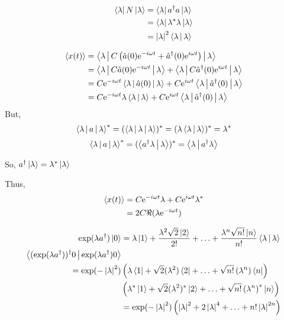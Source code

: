 \documentclass{article}
\newcommand{\me}{\mathrm{e}}
\begin{document}
\begin{align*}
   \Bra{\lambda} N \Ket{\lambda}
   &= \Bra{\lambda} a^{\dagger} a \Ket{\lambda} \\
   &= \Bra{\lambda} \lambda^{*} \lambda \Ket{\lambda} \\
   &= \left| \lambda \right|^{2} \Braket{\lambda|\lambda}
\end{align*}

\begin{align*}
   \Braket{x(t)}
   &= \Braket{\lambda | C \left( \hat{a}(0)\me^{-i \omega t} +
\hat{a}^{\dagger}(0)\me^{i \omega t} \right) | \lambda} \\
&= \Braket{\lambda | C \hat{a}(0)\me^{-i \omega t} | \lambda} +
\Braket{\lambda | C \hat{a}^\dagger(0)\me^{i \omega t} | \lambda} \\
&= C\me^{-i \omega t} \Braket{\lambda | \hat{a}(0) | \lambda} +
C\me^{i \omega t} \Braket{\lambda | \hat{a}^\dagger(0) | \lambda} \\
&= C\me^{-i \omega t} \lambda \Braket{\lambda | \lambda} +
C\me^{i \omega t} \Braket{\lambda | \hat{a}^\dagger(0) | \lambda} \\
\end{align*}
But,
\begin{equation}
   \Braket{\lambda | a | \lambda}^{*} = (\Braket{\lambda | \lambda | \lambda})^{*}
   = (\lambda \Braket{\lambda | \lambda})^* = \lambda^{*}
\end{equation}
\begin{equation}
   \Braket{\lambda | a | \lambda}^{*} = (\Braket{a^{\dagger}\lambda |
   \lambda})^{*} = \Braket{\lambda | a^{\dagger} \lambda}
\end{equation}

So, $ a^{\dagger} \Ket{\lambda} = \lambda^{*} \Ket{\lambda} $

Thus,
\begin{align*}
   \Braket{x(t)} &= C \me^{-i \omega t} \lambda
   + C \me^{i \omega t} \lambda^{*} \\
   &= 2 C \Re(\lambda \me^{-i \omega t})
\end{align*}

\begin{align*}
   \exp(\lambda a^{\dagger})\Ket{0} &= \lambda \Ket{1} + \frac{\lambda^{2}
   \sqrt{2} \Ket{2}}{2!}
   + \ldots + \frac{\lambda^{n} \sqrt{n!} \Ket{n}}{n!}
   \Braket{\lambda|\lambda} \\
   \Braket{(\exp(\lambda a^{\dagger}))^{\dagger}0|\exp(\lambda a^{\dagger})0 } \\ = \exp(- \left| \lambda \right|^{2})
   &\left( \lambda \Bra{1} + \sqrt{2}(\lambda^{2}) \Bra{2} + \ldots +
      \sqrt{n!} \left( \lambda^{n} \right) \Bra{n} \right) \\
      &\left( \lambda^{*} \Ket{1} + \sqrt{2} (\lambda^{2})^{*} \Ket{2} + \ldots +
      \sqrt{n!} \left( \lambda^{n} \right)^{*} \Ket{n} \right) \\
   &= \exp(- \left| \lambda \right|^{2}) \left( \left| \lambda \right|^2 + 2 \left|
\lambda \right|^{4} + \ldots + n! \left| \lambda \right|^{2n} \right)
\end{align*}
\end{document}
